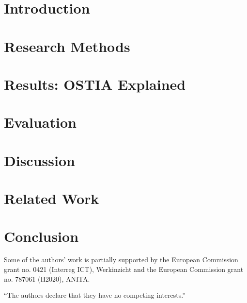 \documentclass[smallextended]{svjour3}       %
\begin{document}
\section{Introduction}
\label{intro}


\section{Research Methods}

\label{ra}


\section{Results: OSTIA Explained}
\label{rs}



\section{Evaluation}
\label{eval}


\section{Discussion}
\label{disc}


\section{Related Work}
\label{rw}


\section{Conclusion}

\label{conc}






\begin{acknowledgements}
Some of the authors' work is partially supported by the European Commission grant no. 0421 (Interreg ICT), Werkinzicht and the European Commission grant no. 787061 (H2020), ANITA.
\end{acknowledgements}



\medskip
\noindent
``The authors declare that they have no competing interests.''


\end{document}
